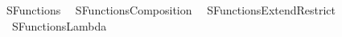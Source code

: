 %
\begin{isabellebody}%
%
%
\isadelimdocument
%
\endisadelimdocument
%
\isatagdocument
%
\isamarkuptrue%
%
\endisatagdocument
{\isafolddocument}%
%
\isadelimdocument
%
\endisadelimdocument
%
\isadelimtheory
%
\endisadelimtheory
%
\isatagtheory
{}\isamarkupfalse%
\ SFunctions\isanewline
{}\isanewline
\ \ SFunctions{\isacharunderscore}{\kern0pt}Composition\isanewline
\ \ SFunctions{\isacharunderscore}{\kern0pt}Extend{\isacharunderscore}{\kern0pt}Restrict\isanewline
\ \ SFunctions{\isacharunderscore}{\kern0pt}Lambda\isanewline
{}\isanewline
\isanewline
{}\isamarkupfalse%
%
\endisatagtheory
{\isafoldtheory}%
%
\isadelimtheory
%
\endisadelimtheory
%
\end{isabellebody}%
\endinput
